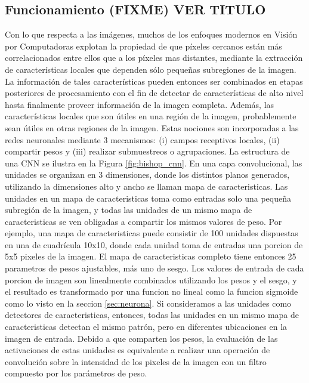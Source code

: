 \documentclass[a4paper,11pt,spanish]{book}
\newcommand*{\FIXME}[1]{{(\textbf{FIXME}) {#1}}}
\begin{document}
    \subsection{Funcionamiento \FIXME{VER TITULO}} 
      Con lo que respecta a las imágenes, muchos de los enfoques modernos en Visión por Computadoras explotan la propiedad de que píxeles cercanos están más correlacionados entre ellos que a los píxeles mas
      distantes, mediante la extracción de características locales que dependen sólo pequeñas subregiones de la imagen. La información de tales características pueden entonces ser combinados
      en etapas posteriores de procesamiento con el fin de detectar de características de alto nivel hasta finalmente proveer información de la imagen completa. Además, las características
      locales que son útiles en una región de la imagen, probablemente sean útiles en otras regiones de la imagen. 
      Estas nociones son incorporadas a las redes neuronales mediante 3 mecanismos: (i) campos receptivos locales, (ii) compartir pesos y (iii) realizar submuestreos o agrupaciones. 
      La estructura de una CNN se ilustra en la Figura \ref{fig:bishop_cnn}. En una capa convolucional, las unidades se organizan en 3 dimensiones, donde los distintos planos generados,
      utilizando la dimensiones alto y ancho se llaman mapa de caracteristicas.
      Las unidades en un mapa de caracteristicas toma como entradas solo una pequeña subregión de la imagen, y todas las unidades de un mismo mapa de caracteristicas se 
      ven obligadas a compartir los mismos valores de peso. Por ejemplo, una mapa de caracteristicas puede consistir de 100 unidades dispuestas en una de cuadrícula 10x10, 
      donde cada unidad  toma de entradas una porcion de 5x5 pixeles de la imagen. El mapa de caracteristicas completo tiene entonces 25 parametros de pesos ajustables,
      más uno de sesgo. Los valores de entrada de cada porcion de imagen son linealmente combinados utilizando los pesos y el sesgo, y el resultado  es transformado por una funcion no lineal
      como la funcion sigmoide como lo visto en la seccion \ref{sec:neurona}. 
      Si consideramos a las unidades como detectores de caracteristicas, entonces, todas las unidades en un mismo mapa de caracteristicas detectan el mismo patrón, pero en diferentes 
      ubicaciones en la imagen de entrada. Debido a que comparten los pesos, la evaluación de las activaciones de estas unidades es equivalente a  realizar una operación de convolución 
      sobre la intensidad de los pixeles de la imagen con un filtro compuesto por los parámetros de peso. 
\end{document}
